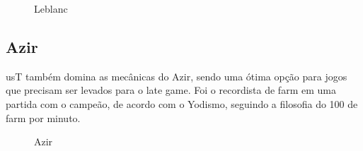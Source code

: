 \begin{multicols}{2}
	\begin{figure}[H]
		\centering
		\caption{Leblanc}
		\label{fig:leblanc}
	\end{figure}
	
	\subsection*{Azir}
	usT também domina as mecânicas do Azir, sendo uma ótima opção para jogos que precisam ser levados para o late game. Foi o recordista de farm em uma partida com o campeão, de acordo com o Yodismo, seguindo a filosofia do 100 de farm por minuto.
	
	\begin{figure}[H]
		\centering
		\caption{Azir}
		\label{fig:fig6}
	\end{figure}
	

\end{multicols}
